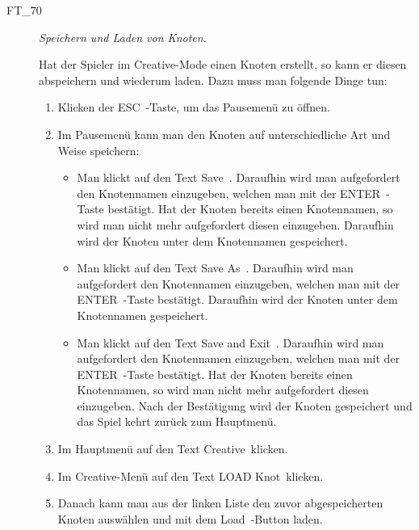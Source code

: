\begin{description}
\begin{enumerate}
		
	\end{enumerate}
	

	\item[FT\_70] \textit{Speichern und Laden von Knoten.} \hfill\\
	
	\label{FT:70}
	
	Hat der Spieler im Creative-Mode einen Knoten erstellt, so kann er diesen abspeichern und wiederum laden. Dazu muss man folgende Dinge tun:
	
		\begin{enumerate} 
	
		\item  Klicken der \glqq ESC\grqq~-Taste, um das Pausemenü zu öffnen.
		\item Im Pausemenü kann man den Knoten auf unterschiedliche Art und Weise speichern:
		 
		\begin{itemize} 
        \item Man klickt auf den Text \glqq Save\grqq~. Daraufhin wird man aufgefordert den Knotennamen einzugeben, welchen man mit der \glqq ENTER\grqq~-Taste bestätigt. Hat der Knoten bereits einen Knotennamen, so wird man nicht mehr aufgefordert diesen einzugeben. Daraufhin wird der Knoten unter dem Knotennamen gespeichert.
        \item Man klickt auf den Text \glqq Save As\grqq~. Daraufhin wird man aufgefordert den Knotennamen einzugeben, welchen man mit der \glqq ENTER\grqq~-Taste bestätigt. Daraufhin wird der Knoten unter dem Knotennamen gespeichert.
        \item Man klickt auf den Text \glqq Save and Exit\grqq~. Daraufhin wird man aufgefordert den Knotennamen einzugeben, welchen man mit der \glqq ENTER\grqq~-Taste bestätigt. Hat der Knoten bereits einen Knotennamen, so wird man nicht mehr aufgefordert diesen einzugeben. Nach der Bestätigung wird der Knoten gespeichert und das Spiel kehrt zurück zum Hauptmenü.	
		
		\end{itemize}
		
		\item Im Hauptmenü auf den Text \glqq Creative\grqq~klicken.
		\item Im Creative-Menü auf den Text \glqq LOAD Knot\grqq~klicken.
		\item Danach kann man aus der linken Liste den zuvor abgespeicherten Knoten auswählen und mit dem \glqq Load\grqq~-Button laden.
		
	\end{enumerate}
	
\end{description}










